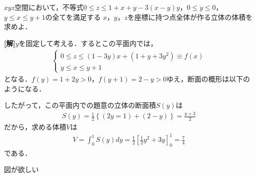 \documentclass[a4j]{jarticle}
\begin{document}

\begin{oframed}
$xyz$空間において，不等式$0\le z\le 1+x+y-3(x-y)y$，$0\le y\le0$，$y\le x\le y+1$の全てを満足する
$x$，$y$，$z$を座標に持つ点全体が作る立体の体積を求めよ．
\end{oframed}

\setlength{\columnseprule}{0.4pt}
\begin{multicols}{2}
{\bf[解]}$y$を固定して考える．するとこの平面内では，
     \begin{align*}
     \left\{
          \begin{array}{l}
          0\le z\le (1-3y)x+(1+y+3y^2)\equiv f(x) \\
          y\le x\le y+1
          \end{array}
     \right.
     \end{align*}
となる．$f(y)=1+2y>0$，$f(y+1)=2-y>0$ゆえ，断面の概形は以下のようになる．

したがって，この平面内での題意の立体の断面積$S(y)$は
     \begin{align*}
     S(y)=\frac{1}{2}\left\{(2y=1)+(2-y)\right\}=\frac{y+3}{2}
     \end{align*}
だから，求める体積$V$は
     \begin{align*}
     V=\int_0^1S(y)dy=\frac{1}{2}\left[\frac{1}{2}y^2+3y\right]_0^1=\frac{7}{4}\tag{答}
     \end{align*}
である．


図が欲しい          
\newpage
\end{multicols}
\end{document}
